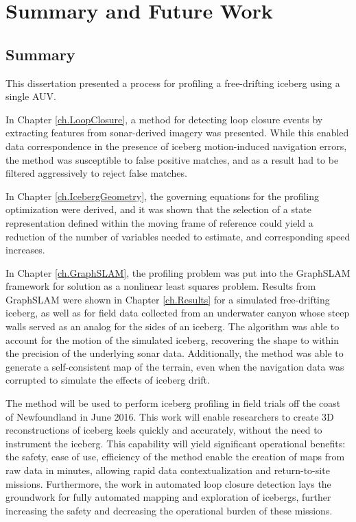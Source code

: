 
\chapter{Summary and Future Work}
\label{ch.FutureWork}

\section{Summary}

This dissertation presented a process for profiling a free-drifting iceberg using a single AUV. 

In Chapter \ref{ch.LoopClosure}, a method for detecting loop closure events by extracting features from sonar-derived imagery was presented. While this enabled data correspondence in the presence of iceberg motion-induced navigation errors, the method was susceptible to false positive matches, and as a result had to be filtered aggressively to reject false matches. 

In Chapter \ref{ch.IcebergGeometry}, the governing equations for the profiling optimization were derived, and it was shown that the selection of a state representation defined within the moving frame of reference could yield a reduction of the number of variables needed to estimate, and corresponding speed increases. 

In Chapter \ref{ch.GraphSLAM}, the profiling problem was put into the GraphSLAM framework for solution as a nonlinear least squares problem. Results from GraphSLAM were shown in Chapter \ref{ch.Results} for a simulated free-drifting iceberg, as well as for field data collected from an underwater canyon whose steep walls served as an analog for the sides of an iceberg. The algorithm was able to account for the motion of the simulated iceberg, recovering the shape to within the precision of the underlying sonar data. Additionally, the method was able to generate a self-consistent map of the terrain, even when the navigation data was corrupted to simulate the effects of iceberg drift. 

The method will be used to perform iceberg profiling in field trials off the coast of Newfoundland in June 2016. This work will enable researchers to create 3D reconstructions of iceberg keels quickly and accurately, without the need to instrument the iceberg. This capability will yield significant operational benefits: the safety, ease of use, efficiency of the method enable the creation of maps from raw data in minutes, allowing rapid data contextualization and return-to-site missions. Furthermore, the work in automated loop closure detection lays the groundwork for fully automated mapping and exploration of icebergs, further increasing the safety and decreasing the operational burden of these missions. 




